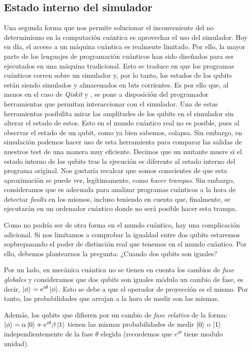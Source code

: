 \subsection{Estado interno del simulador}
\label{subsec:subsec432}
Una segunda forma que nos permite solucionar el inconveniente del no determinismo en la computación cuántica es aprovechar el uso del simulador. Hoy en día, el acceso a un máquina cuántica es realmente limitado. Por ello, la mayor parte de los lenguajes de programación cuánticos han sido diseñados para ser ejecutados en una máquina tradicional. Esto se traduce en que los programas cuánticos corren sobre un simulador y, por lo tanto, los estados de los qubits están siendo simulados y almacenados en bits corrientes. Es por ello que, al menos en el caso de \textit{Qiskit} y \qsh, se pone a disposición del programador herramientas que permitan interaccionar con el simulador. Una de estas herramientas posibilita mirar las amplitudes de los qubits en el simulador sin alterar el estado de estos. Esto en el mundo cuántico real no es posible, pues al observar el estado de un qubit, como ya bien sabemos, colapsa. Sin embargo, en simulación podemos hacer uso de esta herramienta para comparar las salidas de nuestros test de una manera muy eficiente. Decimos que un mutante muere si el estado interno de los qubits tras la ejecución es diferente al estado interno del programa original. Nos gustaría recalcar que somos conscientes de que esta aproximación se puede ver, legítimamente, como {\it hacer trampas}. Sin embargo, consideramos que es adecuada para analizar programas cuánticos a la hora de detectar {\it faults} en los mismos, incluso teniendo en cuenta que, finalmente, se ejecutarán en un ordenador cuántico donde no será posible hacer esta trampa.

Como no podría ser de otra forma en el mundo cuántico, hay una complicación adicional. Si nos limitamos a comprobar la igualdad entre dos qubits estaremos sopbrepasando el poder de distinción real que tenemos en el mundo cuántico. Por ello, debemos plantearnos la pregunta: ¿Cuando dos qubits son iguales?

Por un lado, en mecánica cuántica no se tienen en cuenta los cambios de \textit{fase globales} y consideramos que dos qubits son iguales módulo un cambio de fase, es decir, $\left|\phi\right\rangle =e^{i\theta}\left|\phi\right\rangle$. Esto se debe a que el operador de proyección es el mismo. Por tanto, las probabilidades que arrojan a la hora de medir son las mismas.

Además, los qubits que difieren por un cambio de \textit{fase relativo} de la forma: $\left|\phi\right\rangle= \alpha\left|0\right\rangle + e^{i\theta}\beta\left|1\right\rangle$ tienen las mismas probabilidades de medir $\left|0\right\rangle$ o $\left|1\right\rangle$ independientemente de la fase $\theta$ elegida (recordemos que $e^{i\theta}$ tiene modulo unidad).

